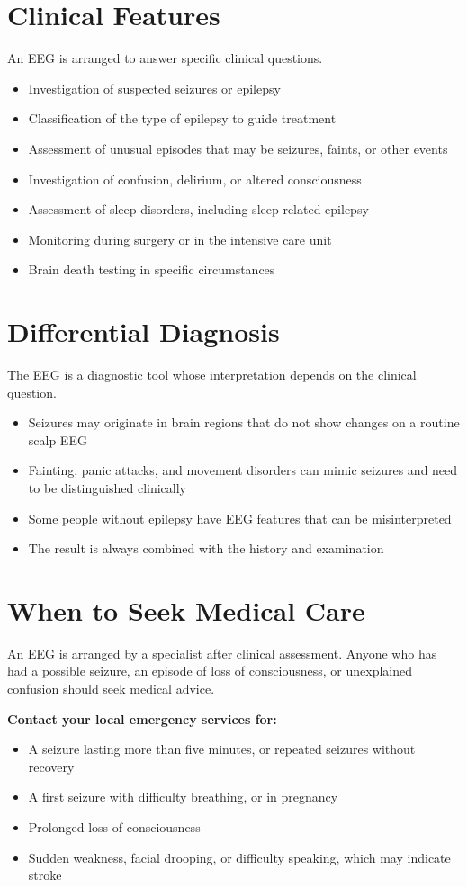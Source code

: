 \section*{Clinical Features}
An EEG is arranged to answer specific clinical questions.
\begin{itemize}
    \item Investigation of suspected seizures or epilepsy
    \item Classification of the type of epilepsy to guide treatment
    \item Assessment of unusual episodes that may be seizures, faints, or other events
    \item Investigation of confusion, delirium, or altered consciousness
    \item Assessment of sleep disorders, including sleep-related epilepsy
    \item Monitoring during surgery or in the intensive care unit
    \item Brain death testing in specific circumstances
\end{itemize}

\section*{Differential Diagnosis}
The EEG is a diagnostic tool whose interpretation depends on the clinical question.
\begin{itemize}
    \item Seizures may originate in brain regions that do not show changes on a routine scalp EEG
    \item Fainting, panic attacks, and movement disorders can mimic seizures and need to be distinguished clinically
    \item Some people without epilepsy have EEG features that can be misinterpreted
    \item The result is always combined with the history and examination
\end{itemize}

\section*{When to Seek Medical Care}
An EEG is arranged by a specialist after clinical assessment. Anyone who has had a possible seizure, an episode of loss of consciousness, or unexplained confusion should seek medical advice.

\textbf{Contact your local emergency services for:}
\begin{itemize}
    \item A seizure lasting more than five minutes, or repeated seizures without recovery
    \item A first seizure with difficulty breathing, or in pregnancy
    \item Prolonged loss of consciousness
    \item Sudden weakness, facial drooping, or difficulty speaking, which may indicate stroke
\end{itemize}

